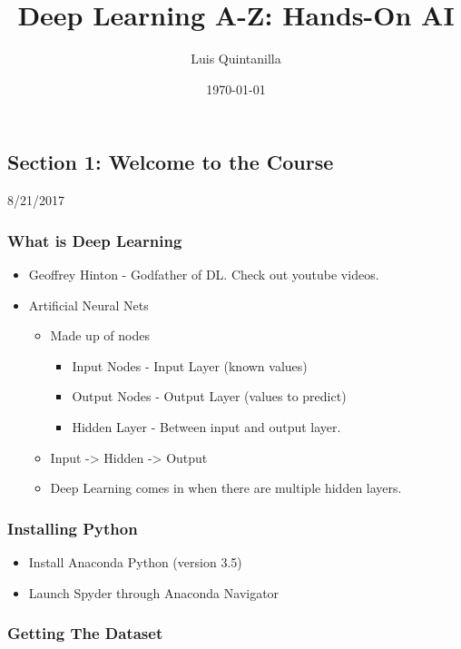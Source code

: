 \documentclass[11pt]{article}
\author{Luis Quintanilla}
\date{\today}
\title{Deep Learning A-Z: Hands-On AI}
\begin{document}
\maketitle
\tableofcontents


\subsection{Section 1: Welcome to the Course}
\label{sec:org7693b2d}

8/21/2017

\subsubsection{What is Deep Learning}
\label{sec:orgf24582f}

\begin{itemize}
\item Geoffrey Hinton - Godfather of DL. Check out youtube videos.
\item Artificial Neural Nets
\begin{itemize}
\item Made up of nodes
\begin{itemize}
\item Input Nodes - Input Layer (known values)
\item Output Nodes - Output Layer (values to predict)
\item Hidden Layer - Between input and output layer.
\end{itemize}
\item Input -> Hidden -> Output
\item Deep Learning comes in when there are multiple hidden layers.
\end{itemize}
\end{itemize}

\subsubsection{Installing Python}
\label{sec:orgbd8c72f}

\begin{itemize}
\item Install Anaconda Python (version 3.5)
\item Launch Spyder through Anaconda Navigator
\end{itemize}

\subsubsection{Getting The Dataset}
\label{sec:org6abb65b}
\end{document}
